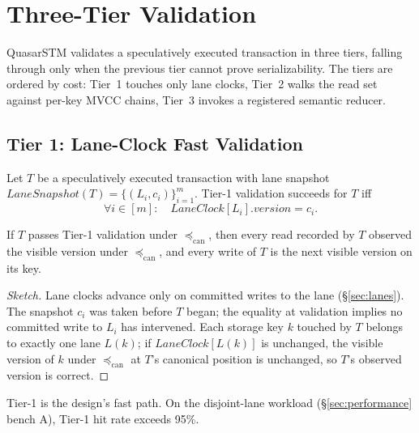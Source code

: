 \section{Three-Tier Validation}

\label{sec:validation}

QuasarSTM validates a speculatively executed transaction in three
tiers, falling through only when the previous tier cannot prove
serializability. The tiers are ordered by cost: Tier~1 touches only
lane clocks, Tier~2 walks the read set against per-key MVCC chains,
Tier~3 invokes a registered semantic reducer.

\subsection{Tier 1: Lane-Clock Fast Validation}

\begin{definition}
\label{def:tier1}
Let $T$ be a speculatively executed transaction with lane snapshot
$\mathit{LaneSnapshot}(T) = \{(L_i, c_i)\}_{i=1}^{m}$. Tier-1
validation succeeds for $T$ iff
\[
\forall i \in [m]:\quad
\mathit{LaneClock}[L_i].\mathit{version} = c_i.
\]
\end{definition}

\begin{lemma}
\label{lem:tier1-sufficient}
If $T$ passes Tier-1 validation under
$\preceq_{\mathrm{can}}$, then every read recorded by $T$ observed the
visible version under $\preceq_{\mathrm{can}}$, and every write of $T$
is the next visible version on its key.
\end{lemma}

\begin{proof}[Sketch]
Lane clocks advance only on committed writes to the lane
(\S\ref{sec:lanes}). The snapshot $c_i$ was taken before $T$ began;
the equality at validation implies no committed write to $L_i$ has
intervened. Each storage key $k$ touched by $T$ belongs to exactly
one lane $L(k)$; if $\mathit{LaneClock}[L(k)]$ is unchanged, the
visible version of $k$ under $\preceq_{\mathrm{can}}$ at $T$'s
canonical position is unchanged, so $T$'s observed version is
correct.
\end{proof}

Tier-1 is the design's fast path. On the disjoint-lane workload
(\S\ref{sec:performance} bench A), Tier-1 hit rate exceeds 95\%.


